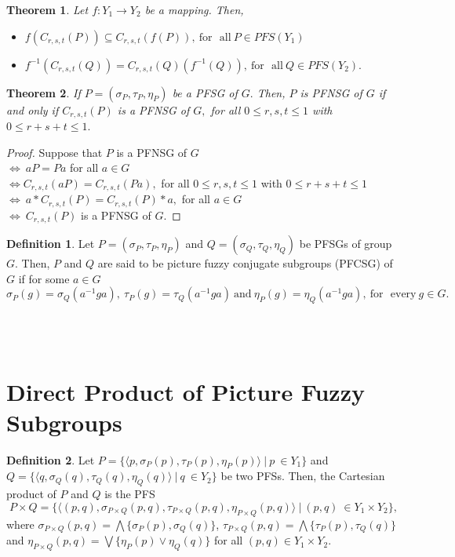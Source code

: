 \documentclass[12pt,letterpaper]{amsart}
\theoremstyle{plain}
\newtheorem{theorem}{Theorem}[section]
\theoremstyle{definition}
\newtheorem{definition}{Definition}[section]
\numberwithin{equation}{section}
\begin{document}
\begin{theorem} \cite{t4}
Let $f: Y_1 \rightarrow Y_2$ be a mapping. Then,
\begin{itemize}
\item [(i)] $f(C_{r, s, t} (P)) \subseteq C_{r, s, t} (f(P)),~ \text{for~ all}~ P \in PFS(Y_1)$
\item [(ii)] $f^{-1}(C_{r, s, t} (Q)) = C_{r, s, t} (Q)(f^{-1}(Q)),~ \text{for~ all}~ Q \in PFS(Y_2).$
\end{itemize}
\end{theorem}

\begin{theorem} \label{2}
If $P = (\sigma_P, \tau_P, \eta_P )$ be a PFSG of $G.$ Then, $P$ is PFNSG of $G$ if and only if $C_{r, s, t} (P)$ is a PFNSG of $G,$ for all $0 \leq r, s, t \leq 1$ with $0 \leq r + s + t \leq 1.$
\end{theorem}

\begin{proof}
Suppose that $P$ is a PFNSG of $G$\\ 
$\iff~ aP = Pa$ for all $a \in G$ \\
$\iff C_{r, s, t} (aP) = C_{r, s, t} (Pa),$ for all $0 \leq r, s, t \leq 1$ with $0 \leq r + s + t \leq 1$\\
$\iff~ a * C_{r, s, t} (P) = C_{r, s, t} (P) * a,$ for all $a \in G$\\
$\iff~ C_{r, s, t} (P)$ is a PFNSG of $G.$ 
\end{proof}

\begin{definition}
Let $P = (\sigma_P, \tau_P, \eta_P)$ and $Q = (\sigma_Q, \tau_Q, \eta_Q)$ be PFSGs of group $G.$ Then, $P$ and $Q$ are said to be picture fuzzy conjugate subgroups (PFCSG) of $G$ if for some $a \in G$ $$\sigma_{P}(g) = \sigma_{Q}(a^{-1} g a),~ \tau_{P}(g) = \tau_{Q}(a^{-1} g a)~ \text{and}~ \eta_{P}(g) = \eta_{Q}(a^{-1} g a),~ \text{for~ every}~ g \in G.$$ 
\end{definition}

\ \\ \ \\

\section{Direct Product of Picture Fuzzy Subgroups}
\begin{definition}
Let $P = \lbrace \langle p, \sigma_P(p), \tau_P(p), \eta_P(p) \rangle~|~p~ \in Y_1 \rbrace$ and $Q = \lbrace \langle q, \sigma_Q(q), \tau_Q(q), \eta_Q(q) \rangle~|~q~ \in Y_2 \rbrace$ be two PFSs. Then, the Cartesian product of $P$ and $Q$ is the PFS $$P \times Q = \lbrace \langle(p, q), \sigma_{P \times Q}(p, q), \tau_{P \times Q}(p, q), \eta_{P \times Q}(p, q)\rangle~|~(p, q)~ \in Y_1 \times Y_2 \rbrace,$$ where $\sigma_{P \times Q}(p, q) = \bigwedge\{\sigma_P(p), \sigma_Q(q)\}$, $\tau_{P \times Q}(p, q) = \bigwedge\{ \tau_P(p), \tau_Q(q)\}$\\ and $\eta_{P \times Q}(p, q) = \bigvee\{ \eta_P(p) \vee \eta_Q(q)\}$ for all $(p, q) \in Y_1 \times Y_2.$
\end{definition}
\end{document}
